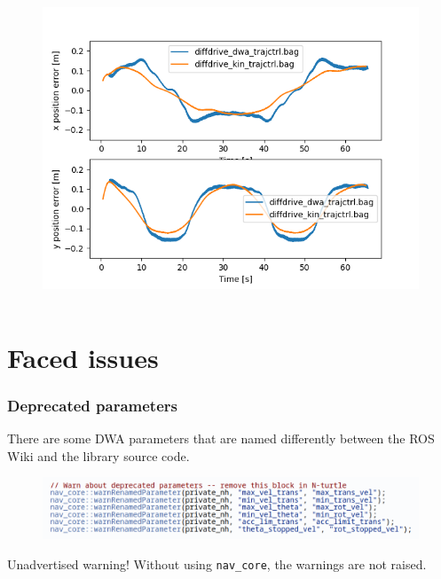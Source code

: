 \documentclass{beamer}
\begin{document}
\begin{frame}[allowframebreaks]
\begin{columns}
\begin{figure}[H]
    \centering
    \includegraphics[scale=0.3]{img/comparison/Position_Error.png}
\end{figure}

\end{columns}

\end{frame}




\section{Faced issues}


\begin{frame}
\frametitle{Deprecated parameters}

There are some DWA parameters that are named differently between the ROS Wiki and
the library source code.

\vspace{1em}

\begin{figure}[H]
    \centering
    \includegraphics[scale=0.4]{img/other/deprecated_parameters_warning.png}
\end{figure}

\vspace{1em}

\begin{alertblock}{Unadvertised warning!}
Without using \texttt{nav\_core}, the warnings are not raised.
\end{alertblock}

\end{frame}
\end{document}
